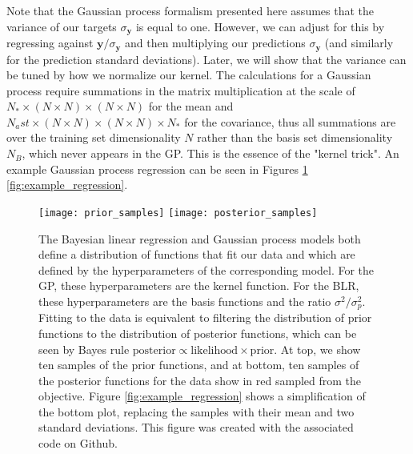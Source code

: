 \documentclass{article}
\begin{document}
Note that the Gaussian process formalism presented here assumes that the variance of our targets $\sigma_\mathbf{y}$ is equal to one. However, we can adjust for this by regressing against $\mathbf{y}/\sigma_\mathbf{y}$ and then multiplying our predictions $\sigma_\mathbf{y}$ (and similarly for the prediction standard deviations). Later, we will show that the variance can be tuned by how we normalize our kernel. The calculations for a Gaussian process require summations in the matrix multiplication at the scale of $N_\ast \times (N \times N) \times (N \times N)$ for the mean and $N_ast \times (N \times N) \times (N \times N) \times N_\ast$ for the covariance, thus all summations are over the training set dimensionality $N$ rather than the basis set dimensionality $N_B$, which never appears in the GP. This is the essence of the "kernel trick". An example Gaussian process regression can be seen in Figures  \ref{fig:priors_and_posteriors} \ref{fig:example_regression}.

\begin{figure}
    \begin{center}
    \texttt{[image: prior\_samples]}
    \texttt{[image: posterior\_samples]}
    \caption{The Bayesian linear regression and Gaussian process models both define a distribution of functions that fit our data and which are defined by the hyperparameters of the corresponding model. For the GP, these hyperparameters are the kernel function. For the BLR, these hyperparameters are the basis functions and the ratio $\sigma^2/\sigma_p^2$. Fitting to the data is equivalent to filtering the distribution of prior functions to the distribution of posterior functions, which can be seen by Bayes rule $\text{posterior}\propto\text{likelihood}\times\text{prior}$. At top, we show ten samples of the prior functions, and at bottom, ten samples of the posterior functions for the data show in red sampled from the objective. Figure \ref{fig:example_regression} shows a simplification of the bottom plot, replacing the samples with their mean and two standard deviations. This figure was created with the associated code on Github.}
    \label{fig:priors_and_posteriors}
    \end{center}
\end{figure}
\end{document}
